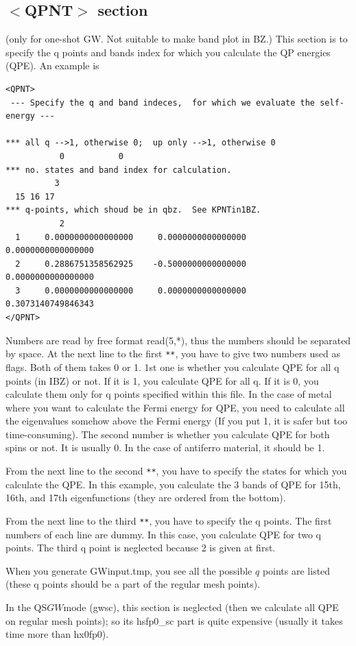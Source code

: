 \documentclass[a4paper,10pt,epsf,fleqn]{article}
\newcommand{\fx}[1]{\subsection{\sf #1\index{\sf #1}}}
\newcommand{\GW}{$GW$}
\begin{document}
{%
\fx{$<$QPNT$>$ section} 
(only for one-shot GW. Not suitable to make band plot in BZ.)
This section is to specify the q points and bands index for which you calculate 
the QP energies (QPE). An example is
{\baselineskip=2.6mm
\begin{verbatim}
<QPNT>
 --- Specify the q and band indeces,  for which we evaluate the self-energy ---

*** all q -->1, otherwise 0;  up only -->1, otherwise 0
           0           0
*** no. states and band index for calculation.
          3
  15 16 17 
*** q-points, which shoud be in qbz.  See KPNTin1BZ.
           2
  1     0.0000000000000000     0.0000000000000000     0.0000000000000000
  2     0.2886751358562925    -0.5000000000000000     0.0000000000000000
  3     0.0000000000000000     0.0000000000000000     0.3073140749846343
</QPNT>
\end{verbatim}}
Numbers are read by free format read(5,*), 
thus the numbers should be separated by space.
At the next line to the first {\tt ***},
you have to give two numbers used as flags. 
Both of them takes 0 or 1.
1st one is whether you calculate QPE for all q points (in IBZ) or not.
If it is 1, you calculate  QPE for all q. If it is 0, you calculate them only for
q points specified within this file. In the case of metal where you want to calculate the Fermi energy for QPE,
you need to calculate all the eigenvalues somehow above the Fermi energy
(If you put 1, it is safer but too time-consuming).
The second number is whether you calculate QPE for
both spins or not. 
It is usually 0. In the case of antiferro material, 
it should be 1.

From the next line to the second {\tt ***},
you have to specify the states for which you calculate the QPE.
In this example, you calculate the 3 bands of QPE for
15th, 16th, and 17th eigenfunctions 
(they are ordered from the bottom).

From the next line to the third {\tt ***},
you have to specify the q points. 
The first numbers of each line are dummy.
In this case, you calculate QPE for two q points.
The third q point is neglected because 2 is given at first.

When you generate GWinput.tmp, you see all the possible $q$ points 
are listed (these q points should be a part of the regular mesh points).

In the QS\GW mode (gwsc),
this section is neglected (then we calculate all QPE on regular mesh points); 
so its hsfp0\_sc part is quite expensive (usually it takes time more than hx0fp0).

}
\end{document}
